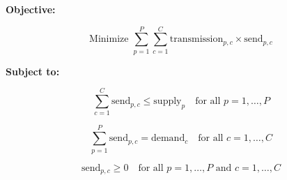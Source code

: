 \documentclass{article}
\begin{document}
\textbf{Objective:}

\[
\text{Minimize } \sum_{p=1}^{P} \sum_{c=1}^{C} \text{transmission}_{p,c} \times \text{send}_{p,c}
\]

\textbf{Subject to:}

\[
\sum_{c=1}^{C} \text{send}_{p,c} \leq \text{supply}_p \quad \text{for all } p = 1, \ldots, P
\]

\[
\sum_{p=1}^{P} \text{send}_{p,c} = \text{demand}_c \quad \text{for all } c = 1, \ldots, C
\]

\[
\text{send}_{p,c} \geq 0 \quad \text{for all } p = 1, \ldots, P \text{ and } c = 1, \ldots, C
\]
\end{document}
